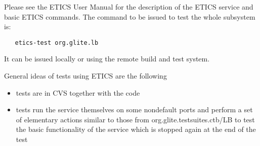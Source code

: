 Please see the ETICS User Manual \cite{etics_manual} for the description
of the ETICS service and basic ETICS commands. The command to be issued to 
test the whole \LB subsystem is:

\begin{verbatim}
   etics-test org.glite.lb
\end{verbatim}

It can be issued locally or using the remote build and test system.

General ideas of \LB tests using ETICS are the following

\begin{itemize}
\item tests are in CVS together with the code

\item tests run the service themselves on some nondefault ports and perform a set of 
elementary actions similar to those from org.glite.testsuites.ctb/LB
to test the basic functionality of the service which is stopped again at the 
end of the test

\end{itemize} 
